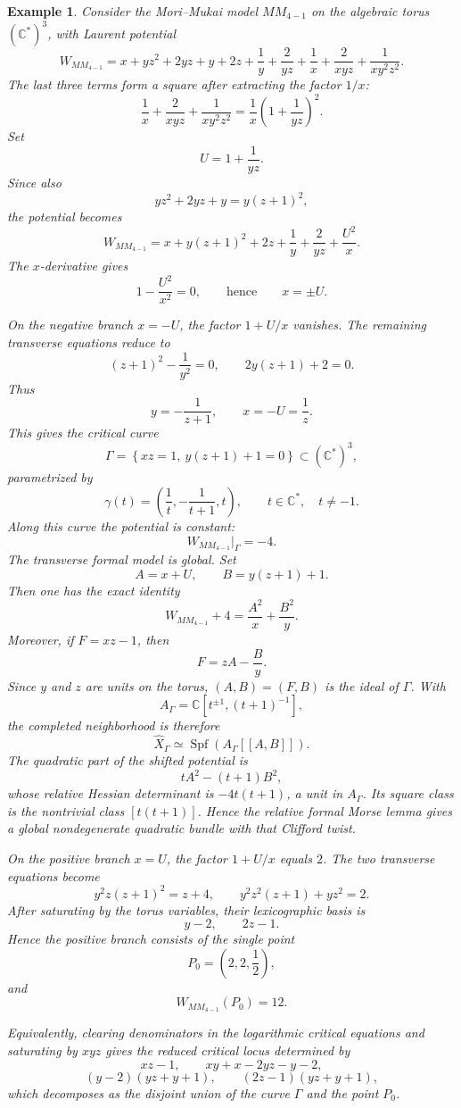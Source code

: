 \documentclass[11pt]{amsart}
\newtheorem{example}{Example}[section]
\begin{document}
\begin{example}
Consider the Mori--Mukai model $MM_{4-1}$ on the algebraic torus
$(\mathbb{C}^*)^3$, with Laurent potential
\[
W_{MM_{4-1}}=x+yz^2+2yz+y+2z+\frac{1}{y}+\frac{2}{yz}
+\frac{1}{x}+\frac{2}{xyz}+\frac{1}{xy^2z^2}.
\]
The last three terms form a square after extracting the factor $1/x$:
\[
\frac{1}{x}+\frac{2}{xyz}+\frac{1}{xy^2z^2}
=\frac{1}{x}\left(1+\frac{1}{yz}\right)^2.
\]
Set
\[
U=1+\frac{1}{yz}.
\]
Since also
\[
yz^2+2yz+y=y(z+1)^2,
\]
the potential becomes
\[
W_{MM_{4-1}}=x+y(z+1)^2+2z+\frac{1}{y}+\frac{2}{yz}+\frac{U^2}{x}.
\]
The $x$-derivative gives
\[
1-\frac{U^2}{x^2}=0,
\qquad\text{hence}\qquad
x=\pm U.
\]

On the negative branch $x=-U$, the factor $1+U/x$ vanishes. The remaining
transverse equations reduce to
\[
(z+1)^2-\frac{1}{y^2}=0,
\qquad
2y(z+1)+2=0.
\]
Thus
\[
y=-\frac{1}{z+1},
\qquad
x=-U=\frac{1}{z}.
\]
This gives the critical curve
\[
\Gamma=\left\{xz=1,\ y(z+1)+1=0\right\}
\subset (\mathbb{C}^*)^3,
\]
parametrized by
\[
\gamma(t)=\left(\frac{1}{t},-\frac{1}{t+1},t\right),
\qquad
t\in\mathbb{C}^*,\quad t\neq -1.
\]
Along this curve the potential is constant:
\[
W_{MM_{4-1}}|_{\Gamma}=-4.
\]
The transverse formal model is global. Set
\[
A=x+U,
\qquad
B=y(z+1)+1.
\]
Then one has the exact identity
\[
W_{MM_{4-1}}+4=\frac{A^2}{x}+\frac{B^2}{y}.
\]
Moreover, if $F=xz-1$, then
\[
F=zA-\frac{B}{y}.
\]
Since $y$ and $z$ are units on the torus, $(A,B)=(F,B)$ is the ideal of
$\Gamma$. With
\[
A_{\Gamma}=\mathbb C[t^{\pm1},(t+1)^{-1}],
\]
the completed neighborhood is therefore
\[
\widehat X_{\Gamma}
\simeq
\operatorname{Spf}\!\left(A_{\Gamma}[[A,B]]\right).
\]
The quadratic part of the shifted potential is
\[
tA^2-(t+1)B^2,
\]
whose relative Hessian determinant is $-4t(t+1)$, a unit in
$A_{\Gamma}$. Its square class is the nontrivial class $[t(t+1)]$. Hence the
relative formal Morse lemma gives a global nondegenerate quadratic bundle with
that Clifford twist.

On the positive branch $x=U$, the factor $1+U/x$ equals $2$. The two transverse
equations become
\[
y^2z(z+1)^2=z+4,
\qquad
y^2z^2(z+1)+yz^2=2.
\]
After saturating by the torus variables, their lexicographic basis is
\[
y-2,
\qquad
2z-1.
\]
Hence the positive branch consists of the single point
\[
P_0=\left(2,2,\frac{1}{2}\right),
\]
and
\[
W_{MM_{4-1}}(P_0)=12.
\]

Equivalently, clearing denominators in the logarithmic critical equations and
saturating by $xyz$ gives the reduced critical locus determined by
\[
xz-1,
\qquad
xy+x-2yz-y-2,
\]
\[
(y-2)(yz+y+1),
\qquad
(2z-1)(yz+y+1),
\]
which decomposes as the disjoint union of the curve $\Gamma$ and the point
$P_0$.


\end{example}
\end{document}
